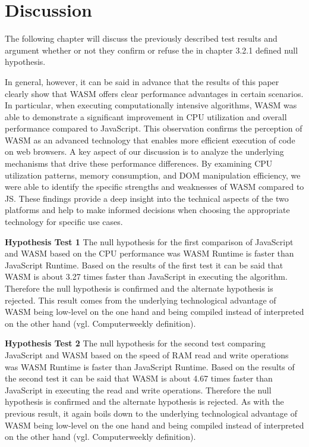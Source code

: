 \newpage
\section{Discussion} \label{discussion}
The following chapter will discuss the previously described test results and argument whether or not they confirm or refuse the in chapter 3.2.1 defined null hypothesis. 

In general, however, it can be said in advance that the results of this paper clearly show that WASM offers clear performance advantages in certain scenarios. In particular, when executing computationally intensive algorithms, WASM was able to demonstrate a significant improvement in CPU utilization and overall performance compared to JavaScript. This observation confirms the perception of WASM as an advanced technology that enables more efficient execution of code on web browsers. 
A key aspect of our discussion is to analyze the underlying mechanisms that drive these performance differences. By examining CPU utilization patterns, memory consumption, and DOM manipulation efficiency, we were able to identify the specific strengths and weaknesses of WASM compared to JS. These findings provide a deep insight into the technical aspects of the two platforms and help to make informed decisions when choosing the appropriate technology for specific use cases.

\textbf{Hypothesis Test 1} \newline
The null hypothesis for the first comparison of JavaScript and WASM based on the CPU performance was \dq WASM Runtime is faster than JavaScript Runtime\dq . Based on the results of the first test it can be said that WASM is about 3.27 times faster than JavaScript in executing the algorithm. Therefore the null hypothesis is confirmed and the alternate hypothesis is rejected. This result comes from the underlying technological advantage of WASM being low-level on the one hand and being compiled instead of interpreted on the other hand (vgl. Computerweekly definition).

\textbf{Hypothesis Test 2} \newline
The null hypothesis for the second test comparing JavaScript and WASM based on the speed of RAM read and write operations was \dq WASM Runtime is faster than JavaScript Runtime\dq . Based on the results of the second test it can be said that WASM is about 4.67 times faster than JavaScript in executing the read and write operations. Therefore the null hypothesis is confirmed and the alternate hypothesis is rejected. As with the previous result, it again boils down to the underlying technological advantage of WASM being low-level on the one hand and being compiled instead of interpreted on the other hand (vgl. Computerweekly definition).

